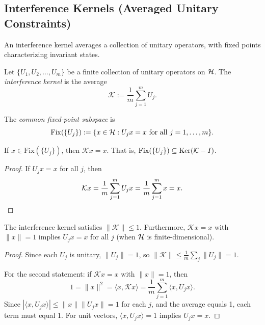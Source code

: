 \subsection{Interference Kernels (Averaged Unitary Constraints)}
\label{subsec:interference-kernel}

An interference kernel averages a collection of unitary operators, with fixed points characterizing invariant states.

\begin{definition}
\label{def:interference-kernel}
Let $\{U_1, U_2, \ldots, U_m\}$ be a finite collection of unitary operators on $\mathcal{H}$.
The \emph{interference kernel} is the average
\[
\mathcal{K} := \frac{1}{m} \sum_{j=1}^{m} U_j.
\]
\end{definition}

\begin{definition}
\label{def:fixed-point-subspace}
The \emph{common fixed-point subspace} is
\[
\mathrm{Fix}(\{U_j\}) := \{ x \in \mathcal{H} : U_j x = x \text{ for all } j = 1, \ldots, m \}.
\]
\end{definition}

\begin{lemma}
\label{lem:fixed-eigenvector}
If $x \in \mathrm{Fix}(\{U_j\})$, then $\mathcal{K} x = x$.
That is, $\mathrm{Fix}(\{U_j\}) \subseteq \mathrm{Ker}(\mathcal{K} - I)$.
\end{lemma}

\begin{proof}
If $U_j x = x$ for all $j$, then
\[
\mathcal{K} x = \frac{1}{m} \sum_{j=1}^{m} U_j x = \frac{1}{m} \sum_{j=1}^{m} x = x. \qedhere
\]
\end{proof}

\begin{lemma}
\label{lem:kernel-spectral}
The interference kernel satisfies $\|\mathcal{K}\| \le 1$.
Furthermore, $\mathcal{K} x = x$ with $\|x\| = 1$ implies $U_j x = x$ for all $j$ (when $\mathcal{H}$ is finite-dimensional).
\end{lemma}

\begin{proof}
Since each $U_j$ is unitary, $\|U_j\| = 1$, so $\|\mathcal{K}\| \le \frac{1}{m} \sum_j \|U_j\| = 1$.

For the second statement: if $\mathcal{K} x = x$ with $\|x\| = 1$, then
\[
1 = \|x\|^2 = \langle x, \mathcal{K} x \rangle = \frac{1}{m} \sum_{j=1}^{m} \langle x, U_j x \rangle.
\]
Since $|\langle x, U_j x \rangle| \le \|x\| \|U_j x\| = 1$ for each $j$, and the average equals 1, each term must equal 1.
For unit vectors, $\langle x, U_j x \rangle = 1$ implies $U_j x = x$.
\end{proof}

